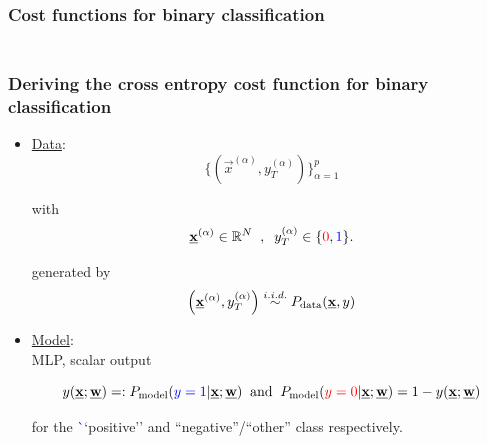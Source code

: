 
\subsubsection{Cost functions for binary classification}

\begin{frame}\frametitle{\subsubsecname\\Deriving the cross entropy cost function for binary classification}


\begin{itemize}
\item[]\underline{Data}:\\

\begin{equation}
\Big\{ \left( \vec x^{(\alpha)}, y_T^{(\alpha)} \right) \Big \}_{\alpha=1}^{p}
\end{equation}

with 
$$
\vec x^{(\alpha)} \in \R^N\;\;,\;\; y_T^{(\alpha)} \in \{{\color{red}0}, {\color{blue}1}\}.
$$

generated by
\begin{equation}
\left( \vec x^{(\alpha)}, y_T^{(\alpha)} \right) \stackrel{\iid}{\sim} P_{\text{data}}(\vec x, y)
\end{equation}

\pause

\item[]\underline{Model}:\\

MLP, scalar output 

\begin{equation}
y(\vec x;\vec w) =: P_{\text{model}} ({\color{blue}y=1}|\vec x;\vec w) \;\; \text{and} \;\; P_{\text{model}} ({\color{red}y=0}|\vec x; \vec w) = 1-y(\vec x;\vec w)
\end{equation}

for the \textcolor{blue}``positive'' and ``negative''/``other'' class respectively.

\end{itemize}

\end{frame}

